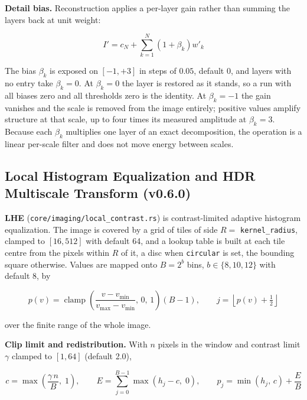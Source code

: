 \documentclass[11pt,a4paper]{article}
\newcommand{\code}[1]{\texttt{\small #1}}
\begin{document}
    \textbf{Detail bias.} Reconstruction applies a per-layer gain rather than summing the layers back at unit weight:

    \begin{equation}
        \boxed{
            I' = c_N + \sum_{k=1}^{N} \left(1 + \beta_k\right) w'_k
        }
    \end{equation}

    The bias $\beta_k$ is exposed on $[-1, +3]$ in steps of $0.05$, default $0$, and layers with no entry take $\beta_k = 0$. At $\beta_k = 0$ the layer is restored as it stands, so a run with all biases zero and all thresholds zero is the identity. At $\beta_k = -1$ the gain vanishes and the scale is removed from the image entirely; positive values amplify structure at that scale, up to four times its measured amplitude at $\beta_k = 3$. Because each $\beta_k$ multiplies one layer of an exact decomposition, the operation is a linear per-scale filter and does not move energy between scales.

    \subsection{Local Histogram Equalization and HDR Multiscale Transform (v0.6.0)}
    \label{sec:lhe_hdrmt}

    \textbf{LHE} (\code{core/imaging/local\_contrast.rs}) is contrast-limited adaptive histogram equalization. The image is covered by a grid of tiles of side $R = $ \code{kernel\_radius}, clamped to $[16, 512]$ with default 64, and a lookup table is built at each tile centre from the pixels within $R$ of it, a disc when \code{circular} is set, the bounding square otherwise. Values are mapped onto $B = 2^b$ bins, $b \in \{8, 10, 12\}$ with default 8, by

    \begin{equation}
        p(v) = \operatorname{clamp}\!\left(\frac{v - v_{\min}}{v_{\max} - v_{\min}},\, 0,\, 1\right) (B - 1),
        \qquad j = \left\lfloor p(v) + \tfrac{1}{2} \right\rfloor
    \end{equation}

    over the finite range of the whole image.

    \textbf{Clip limit and redistribution.} With $n$ pixels in the window and contrast limit $\gamma$ clamped to $[1, 64]$ (default 2.0),

    \begin{equation}
        \boxed{
            c = \max\!\left(\frac{\gamma \, n}{B},\; 1\right),
            \qquad
            E = \sum_{j=0}^{B-1} \max\!\left(h_j - c,\; 0\right),
            \qquad
            p_j = \min(h_j,\, c) + \frac{E}{B}
        }
    \end{equation}
\end{document}

